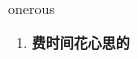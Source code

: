 
\begin{frame}
{\huge onerous}
\begin{center}
\begin{enumerate}\Large
  \item \textbf{费时间花心思的}
\end{enumerate}
\end{center}
\end{frame}
